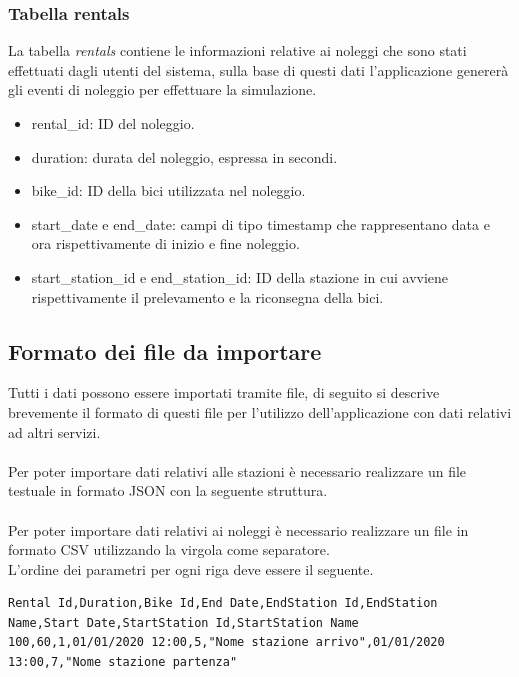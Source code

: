 \documentclass[a4paper, 12pt]{article}
\begin{document}
	\subsubsection{Tabella rentals}

	La tabella \textit{rentals} contiene le informazioni relative ai noleggi che sono stati effettuati dagli utenti del sistema, sulla base di questi dati l'applicazione genererà gli eventi di noleggio per effettuare la simulazione.

	\begin{itemize}
		\item rental\_id: ID del noleggio.
		\item duration: durata del noleggio, espressa in secondi.
		\item bike\_id: ID della bici utilizzata nel noleggio.
		\item start\_date e end\_date: campi di tipo timestamp che rappresentano data e ora rispettivamente di inizio e fine noleggio.
		\item start\_station\_id e end\_station\_id: ID della stazione in cui avviene rispettivamente il prelevamento e la riconsegna della bici.
	\end{itemize}

	\subsection{Formato dei file da importare}

	Tutti i dati possono essere importati tramite file, di seguito si descrive brevemente il formato di questi file per l'utilizzo dell'applicazione con dati relativi ad altri servizi.\\\\
Per poter importare dati relativi alle stazioni è necessario realizzare un file testuale in formato JSON con la seguente struttura.\\
	
	

	\text{}\\
Per poter importare dati relativi ai noleggi è necessario realizzare un file in formato CSV utilizzando la virgola come separatore.\\ L'ordine dei parametri per ogni riga deve essere il seguente.\\

	\begin{lstlisting}[breaklines=true]
Rental Id,Duration,Bike Id,End Date,EndStation Id,EndStation Name,Start Date,StartStation Id,StartStation Name
100,60,1,01/01/2020 12:00,5,"Nome stazione arrivo",01/01/2020 13:00,7,"Nome stazione partenza"
	\end{lstlisting}
\end{document}
